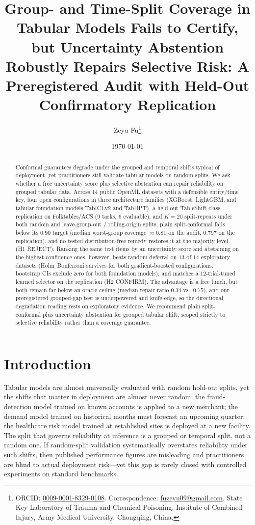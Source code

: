 \documentclass[11pt]{article}
\title{Group- and Time-Split Coverage in Tabular Models Fails to Certify, but
  Uncertainty Abstention Robustly Repairs Selective Risk: A Preregistered Audit
  with Held-Out Confirmatory Replication}
\author{Zeyu Fu\thanks{ORCID:
    \href{https://orcid.org/0009-0001-8329-0108}{0009-0001-8329-0108}.
    Correspondence: \href{mailto:fuzeyu09@gmail.com}{fuzeyu09@gmail.com}.
    State Key Laboratory of Trauma and Chemical Poisoning, Institute of Combined Injury,
    Army Medical University, Chongqing, China.}}
\date{\today}
\begin{document}
\maketitle

\begin{abstract}
\noindent Conformal guarantees degrade under the grouped and temporal shifts typical of deployment, yet
practitioners still validate tabular models on random splits. We ask whether a free uncertainty score
plus selective abstention can repair reliability on grouped tabular data. Across $14$ public OpenML
datasets with a defensible entity/time key, four open configurations in three architecture families
(XGBoost, LightGBM, and tabular foundation models TabICLv2 and TabDPT), a held-out TableShift-class
replication on Folktables/ACS ($9$ tasks, $6$ evaluable), and $K{=}20$ split-repeats under both
random and leave-group-out / rolling-origin splits, plain split-conformal falls below its $0.90$
target (median worst-group coverage $\approx0.81$ on the audit, $0.797$ on the replication), and no
tested distribution-free remedy restores it at the majority level (H1 REJECT). Ranking the same test
items by an uncertainty score and abstaining on the highest-confidence ones, however, beats random
deferral on $13$ of $14$ exploratory datasets (Holm--Bonferroni survives for both gradient-boosted
configurations; bootstrap CIs exclude zero for both foundation models), and matches a $12$-trial-tuned
learned selector on the replication (H2 CONFIRM). The advantage is a free lunch, but both remain far
below an oracle ceiling (median repair ratio $0.34$ vs.\ $0.75$), and our preregistered grouped-gap
test is underpowered and knife-edge, so the directional degradation reading rests on exploratory
evidence. We recommend plain split-conformal plus uncertainty abstention for grouped tabular shift,
scoped strictly to selective reliability rather than a coverage guarantee.
\end{abstract}

\section{Introduction}\label{sec:intro}
Tabular models are almost universally evaluated with random hold-out splits, yet the shifts that matter in
deployment are almost never random: the fraud-detection model trained on known accounts is applied to a new
merchant; the demand model trained on historical months must forecast an upcoming quarter; the healthcare risk
model trained at established sites is deployed at a new facility.
The split that governs reliability at inference is a grouped or temporal split, not a random one.
If random-split validation systematically overstates reliability under such shifts, then published performance
figures are misleading and practitioners are blind to actual deployment risk---yet this gap is
rarely closed with controlled experiments on standard benchmarks.
\end{document}
